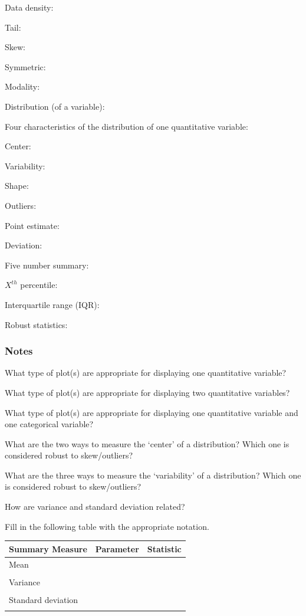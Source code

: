 \documentclass[
]{report}
\newcommand{\rgs}{\vspace{12pt}} %
\newcommand{\rgi}{\hspace{24pt}}  %
\begin{document}
Data density:
\rgs

Tail:
\rgs

Skew:
\rgs

Symmetric:
\rgs

Modality:
\rgs

Distribution (of a variable):
\rgs

\rgi Four characteristics of the distribution of one quantitative variable:

\rgi Center:
\rgs

\rgi Variability:
\rgs

\rgi Shape:
\rgs

\rgi Outliers:
\rgs

Point estimate:
\rgs

Deviation:
\rgs

Five number summary:
\rgs

\(X^{th}\) percentile:
\rgs

Interquartile range (IQR):
\rgs

Robust statistics:
\rgs

\hypertarget{notes-5}{%
\subsubsection*{Notes}\label{notes-5}}

What type of plot(s) are appropriate for displaying one quantitative variable?
\rgs

What type of plot(s) are appropriate for displaying two quantitative variables?
\rgs

What type of plot(s) are appropriate for displaying one quantitative variable and one categorical variable?
\rgs

What are the two ways to measure the `center' of a distribution? Which one is considered robust to skew/outliers?
\rgs

What are the three ways to measure the `variability' of a distribution? Which one is considered robust to skew/outliers?
\rgs

How are variance and standard deviation related?
\rgs

Fill in the following table with the appropriate notation.

\begin{center}
\begin{tabular}{|l|p{2in}|p{2in}|} \hline
Summary Measure & Parameter & Statistic \\ \hline
Mean & & \\ 
& & \\ \hline
Variance & & \\ 
& & \\ \hline
Standard deviation & & \\ 
& & \\ \hline
\end{tabular}
\end{center}
\end{document}
